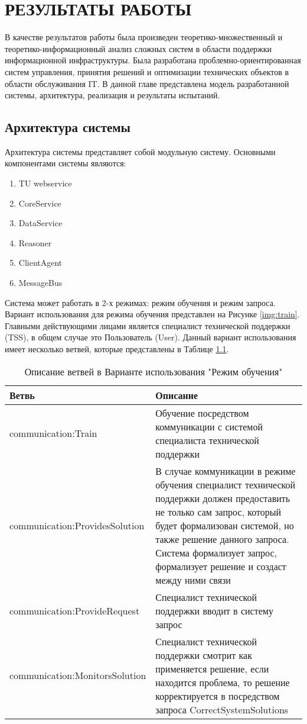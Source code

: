 \chapter{РЕЗУЛЬТАТЫ РАБОТЫ}
В качестве результатов работы была произведен теоретико-множественный и теоретико-информационный анализ сложных систем в области поддержки информационной инфраструктуры. Была разработана проблемно-ориентированная систем управления, принятия решений и оптимизации технических объектов в области обслуживания IT. В данной главе представлена модель разработанной системы, архитектура, реализация и результаты испытаний.
\section{Архитектура системы}
Архитектура системы представляет собой модульную систему. Основными компонентами системы являются:
\begin{enumerate}
	\item TU webservice
	\item CoreService
	\item DataService
	\item Reasoner
	\item ClientAgent
	\item MessageBus
\end{enumerate}
Система может работать в 2-х режимах: режим обучения и режим запроса. Вариант использования для режима обучения представлен на Рисунке \ref{img:train}. Главными действующими лицами является специалист технической поддержки (TSS), в общем случае это Пользователь (User). Данный вариант использования имеет несколько ветвей, которые представлены в Таблице \ref{TrainUseCaseTable}.

\begin{table} [htbp]
  \centering
  \parbox{15cm}{\caption{Описание ветвей в Варианте использования "Режим обучения" }\label{TrainUseCaseTable}}
  \begin{tabular}{| p{7cm} || p{7cm} |}
  \hline
  \hline
Ветвь & Описание \\
  \hline
    \hline
communication:Train	& Обучение посредством коммуникации с системой специалиста технической поддержки \\
  \hline
communication:ProvidesSolution  & В случае коммуникации в режиме обучения специалист технической поддержки должен предоставить не только сам запрос, который будет формализован системой, но также решение данного запроса. Система формализует запрос, формализует решение и создаст между ними связи \\
  \hline
communication:ProvideRequest & Специалист технической поддержки вводит в систему запрос \\
  \hline
communication:MonitorsSolution  & Специалист технической поддержки смотрит как применяется решение, если находится проблема, то решение корректируется в посредством запроса CorrectSystemSolutions \\
  \hline
  \hline
  \end{tabular}
\end{table}


